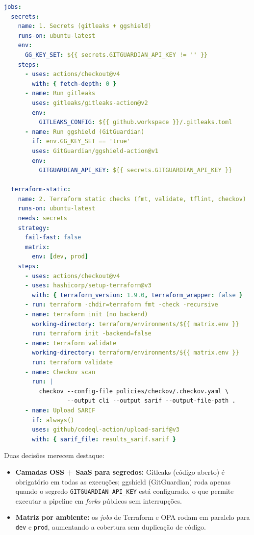 \begin{lstlisting}[language=yaml,caption={Trecho da pipeline \texttt{security-scan.yml} (PoC AWS): detecção de segredos com Gitleaks (obrigatório) e ggshield (opcional), seguida de \texttt{fmt}, \texttt{validate}, \texttt{tflint} e \texttt{Checkov} em matriz de ambientes.},label={lst:aws-pipeline}]
jobs:
  secrets:
    name: 1. Secrets (gitleaks + ggshield)
    runs-on: ubuntu-latest
    env:
      GG_KEY_SET: ${{ secrets.GITGUARDIAN_API_KEY != '' }}
    steps:
      - uses: actions/checkout@v4
        with: { fetch-depth: 0 }
      - name: Run gitleaks
        uses: gitleaks/gitleaks-action@v2
        env:
          GITLEAKS_CONFIG: ${{ github.workspace }}/.gitleaks.toml
      - name: Run ggshield (GitGuardian)
        if: env.GG_KEY_SET == 'true'
        uses: GitGuardian/ggshield-action@v1
        env:
          GITGUARDIAN_API_KEY: ${{ secrets.GITGUARDIAN_API_KEY }}

  terraform-static:
    name: 2. Terraform static checks (fmt, validate, tflint, checkov)
    runs-on: ubuntu-latest
    needs: secrets
    strategy:
      fail-fast: false
      matrix:
        env: [dev, prod]
    steps:
      - uses: actions/checkout@v4
      - uses: hashicorp/setup-terraform@v3
        with: { terraform_version: 1.9.0, terraform_wrapper: false }
      - run: terraform -chdir=terraform fmt -check -recursive
      - name: terraform init (no backend)
        working-directory: terraform/environments/${{ matrix.env }}
        run: terraform init -backend=false
      - name: terraform validate
        working-directory: terraform/environments/${{ matrix.env }}
        run: terraform validate
      - name: Checkov scan
        run: |
          checkov --config-file policies/checkov/.checkov.yaml \
                  --output cli --output sarif --output-file-path .
      - name: Upload SARIF
        if: always()
        uses: github/codeql-action/upload-sarif@v3
        with: { sarif_file: results_sarif.sarif }
\end{lstlisting}

Duas decisões merecem destaque:

\begin{itemize}
    \item \textbf{Camadas OSS + SaaS para segredos:} Gitleaks (código aberto) é obrigatório em todas as execuções; ggshield (GitGuardian) roda apenas quando o segredo \texttt{GITGUARDIAN\_API\_KEY} está configurado, o que permite executar a pipeline em \textit{forks} públicos sem interrupções.
    \item \textbf{Matriz por ambiente:} os \textit{jobs} de Terraform e OPA rodam em paralelo para \texttt{dev} e \texttt{prod}, aumentando a cobertura sem duplicação de código.
\end{itemize}

